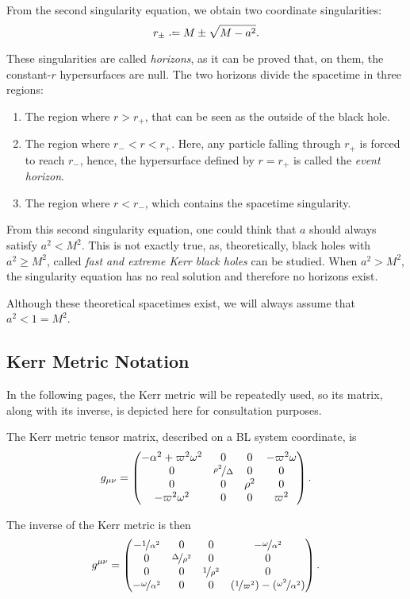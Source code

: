 From the second singularity equation, we obtain two coordinate singularities:
\[
r_{\pm} \defeq M \pm \sqrt{M - a^2}.
\]

These singularities are called \emph{horizons}, as it can be proved \cite[p. 15]{galindo14} that, on them, the constant-$r$ hypersurfaces are null. The two horizons divide the spacetime in three regions:
\begin{enumerate}
	\item The region where $r > r_+$, that can be seen as the outside of the black hole.
	\item The region where $r_- < r < r_+$. Here, any particle falling through $r_+$ is forced to reach $r_-$, hence, the hypersurface defined by $r = r_+$ is called the \emph{event horizon}.
	\item The region where $r < r_-$, which contains the spacetime singularity.
\end{enumerate}

\begin{remark}
	From this second singularity equation, one could think that $a$ should always satisfy $a^2 < M^2$. This is not exactly true, as, theoretically, black holes with $a^2 \geq M^2$, called \emph{fast and extreme Kerr black holes} can be studied. When $a^2 > M^2$, the singularity equation has no real solution and therefore no horizons exist.
	
	Although these theoretical spacetimes exist, we will always assume that $a^2 < 1 = M^2$.
\end{remark}

\subsection{Kerr Metric Notation}

In the following pages, the Kerr metric will be repeatedly used, so its matrix, along with its inverse, is depicted here for consultation purposes.

The Kerr metric tensor matrix, described on a \ac{BL} system coordinate, is
\[
g_{\mu\nu} = \begin{pmatrix}
-\alpha^2 + \varpi^2\omega^2 & 0 & 0 & -\varpi^2\omega \\
0 & \nicefrac{\rho^2}{\Delta} & 0 & 0 \\
0 & 0 & \rho^2 & 0 \\
-\varpi^2\omega^2 & 0 & 0 & \varpi^2
\end{pmatrix}.
\]

The inverse of the Kerr metric is then
\[
g^{\mu\nu} = \begin{pmatrix}
-\nicefrac{1}{\alpha^2} & 0 & 0 & -\nicefrac{\omega}{\alpha^2} \\
0 & \nicefrac{\Delta}{\rho^2} & 0 & 0 \\
0 & 0 & \nicefrac{1}{\rho^2} & 0 \\
-\nicefrac{\omega}{\alpha^2} & 0 & 0 & (\nicefrac{1}{\varpi^2}) - (\nicefrac{\omega^2}{\alpha^2})
\end{pmatrix}.
\]


